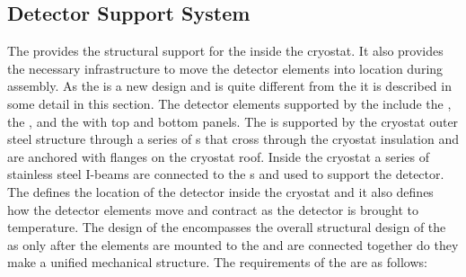 \subsection{Detector Support System}

The  provides the structural support for the 
inside the cryostat.  It also provides the necessary
infrastructure to move the detector elements into location during
assembly. As the  is a new design and is quite different
from the   it is described in some detail in this
section. The detector elements supported by the  include
the , the , and the  with
top and bottom  panels.  The  is supported by the
cryostat outer steel structure through a series of \fdth{}s that
cross through the cryostat insulation and are anchored with flanges on
the cryostat roof. Inside the cryostat a series of stainless steel
I-beams are connected to the \fdth{}s and used to support the
detector. The  defines the location of the detector inside
the cryostat and it also defines how the detector elements
move and contract as the detector is brought to 
temperature. The design of the  encompasses the overall
structural design of the  as only after the elements are
mounted to the  and are connected together do they make a
unified mechanical structure. The requirements of the  are
as follows:
